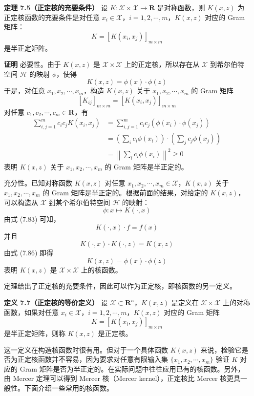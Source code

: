 \documentclass[UTF8, 12pt, fontset=fandol, oneside]{ctexart}
\begin{document}
\noindent\textbf{定理 7.5（正定核的充要条件）}\quad
设 $K:\mathcal{X}\times\mathcal{X}\to\mathbf{R}$ 是对称函数，则 $K(x,z)$ 为正定核函数的充要条件是对任意 $x_i\in\mathcal{X}$，$i=1,2,\cdots,m$，$K(x,z)$ 对应的 Gram 矩阵：
\begin{equation}
K=[K(x_i,x_j)]_{m\times m}
\tag{7.85}
\end{equation}
是半正定矩阵。

\noindent\textbf{证明}\quad
必要性。由于 $K(x,z)$ 是 $\mathcal{X}\times\mathcal{X}$ 上的正定核，所以存在从 $\mathcal{X}$ 到希尔伯特空间 $\mathcal{H}$ 的映射 $\phi$，使得
\[
K(x,z)=\phi(x)\cdot\phi(z)
\]
于是，对任意 $x_1,x_2,\cdots,x_m$，构造 $K(x,z)$ 关于 $x_1,x_2,\cdots,x_m$ 的 Gram 矩阵
\[
[K_{ij}]_{m\times m}=[K(x_i,x_j)]_{m\times m}
\]
对任意 $c_1,c_2,\cdots,c_m\in\mathbf{R}$，有
\[
\begin{aligned}
\sum_{i,j=1}^m c_i c_j K(x_i,x_j)
&=\sum_{i,j=1}^m c_i c_j(\phi(x_i)\cdot\phi(x_j))\\
&=\left(\sum_i c_i\phi(x_i)\right)\cdot\left(\sum_j c_j\phi(x_j)\right)\\
&=\left\|\sum_i c_i\phi(x_i)\right\|^2\geq 0
\end{aligned}
\]
表明 $K(x,z)$ 关于 $x_1,x_2,\cdots,x_m$ 的 Gram 矩阵是半正定的。

充分性。已知对称函数 $K(x,z)$ 对任意 $x_1,x_2,\cdots,x_m\in\mathcal{X}$，$K(x,z)$ 关于 $x_1,x_2,\cdots,x_m$ 的 Gram 矩阵是半正定的。根据前面的结果，对给定的 $K(x,z)$，可以构造从 $\mathcal{X}$ 到某个希尔伯特空间 $\mathcal{H}$ 的映射：
\begin{equation}
\phi:x\mapsto K(\cdot,x)
\tag{7.86}
\end{equation}
由式 (7.83) 可知，
\[
K(\cdot,x)\cdot f=f(x)
\]
并且
\[
K(\cdot,x)\cdot K(\cdot,z)=K(x,z)
\]
由式 (7.86) 即得
\[
K(x,z)=\phi(x)\cdot\phi(z)
\]
表明 $K(x,z)$ 是 $\mathcal{X}\times\mathcal{X}$ 上的核函数。

定理给出了正定核的充要条件，因此可以作为正定核，即核函数的另一定义。

\noindent\textbf{定义 7.7（正定核的等价定义）}\quad
设 $\mathcal{X}\subset\mathbf{R}^n$，$K(x,z)$ 是定义在 $\mathcal{X}\times\mathcal{X}$ 上的对称函数，如果对任意 $x_i\in\mathcal{X}$，$i=1,2,\cdots,m$，$K(x,z)$ 对应的 Gram 矩阵
\begin{equation}
K=[K(x_i,x_j)]_{m\times m}
\tag{7.87}
\end{equation}
是半正定矩阵，则称 $K(x,z)$ 是正定核。

这一定义在构造核函数时很有用。但对于一个具体函数 $K(x,z)$ 来说，检验它是否为正定核函数并不容易，因为要求对任意有限输入集 $\{x_1,x_2,\cdots,x_m\}$ 验证 $K$ 对应的 Gram 矩阵是否为半正定的。在实际问题中往往应用已有的核函数。另外，由 Mercer 定理可以得到 Mercer 核（Mercer kernel），正定核比 Mercer 核更具一般性。下面介绍一些常用的核函数。
\end{document}
